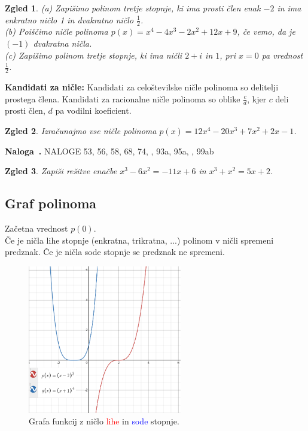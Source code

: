 \documentclass{article}
\newcounter{example}[section]
\newenvironment{example}[1][]{\refstepcounter{example}\par\medskip
   \noindent \textbf{Naloga~\theexample. #1} \rmfamily}{\medskip}
\newtheorem*{zgled}{Zgled}
\begin{document}
\begin{zgled}
    (a) Zapišimo polinom tretje stopnje, ki ima prosti člen enak $-2$ in ima enkratno ničlo 1 in dvakratno ničlo $\frac{1}{2}$.\\
    (b) Poiščimo ničle polinoma $p(x)=x^4-4x^3-2x^2+12x+9$, če vemo, da je $(-1)$ dvakratna ničla.\\
    (c) Zapišimo polinom tretje stopnje, ki ima ničli $2+i$ in $1$, pri $x=0$ pa vrednost $\frac{1}{2}$.\\
\end{zgled}

\textbf{Kandidati za ničle:} Kandidati za celoštevilske ničle polinoma so delitelji prostega člena. Kandidati za racionalne ničle polinoma so oblike $\frac{c}{d}$, kjer $c$ deli prosti člen, $d$ pa vodilni koeficient.

\begin{zgled}
    Izračunajmo vse ničle polinoma $p(x)=12x^4-20x^3+7x^2+2x-1$.
\end{zgled}

\begin{example}
    NALOGE 53, 56, 58, 68, 74, , 93a, 95a, , 99ab
\end{example}

\begin{zgled}
    Zapiši rešitve enačbe $x^3-6x^2=-11x+6$ in $x^3+x^2=5x+2$.
\end{zgled}


\subsection{Graf polinoma}

Začetna vrednost $p(0)$.\\
Če je ničla lihe stopnje (enkratna, trikratna, ...) polinom v ničli spremeni predznak. Če je ničla sode stopnje se predznak ne spremeni.

\begin{figure}[H]
\includegraphics[width=0.6\textwidth]{polinomi.grafi.png}
\centering
\caption{Grafa funkcij z ničlo \textcolor{red}{lihe} in \textcolor{blue}{sode} stopnje.}
\centering
\end{figure}
\end{document}
